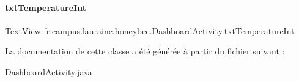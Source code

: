\paragraph{\texorpdfstring{txt\+Temperature\+Int}{txtTemperatureInt}}
{\footnotesize\ttfamily Text\+View fr.\+campus.\+laurainc.\+honeybee.\+Dashboard\+Activity.\+txt\+Temperature\+Int\hspace{0.3cm}{\ttfamily [private]}}



La documentation de cette classe a été générée à partir du fichier suivant \+:\begin{DoxyCompactItemize}
\item 
\hyperlink{_dashboard_activity_8java}{Dashboard\+Activity.\+java}\end{DoxyCompactItemize}

